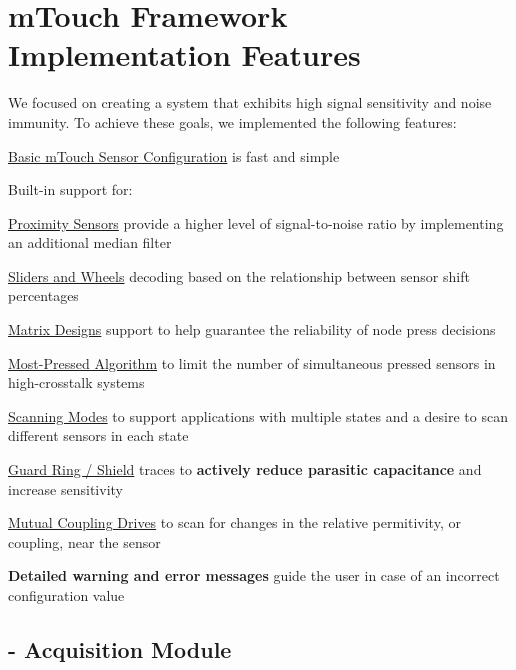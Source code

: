 \hypertarget{_framework_features_Features}{}\section{m\+Touch Framework Implementation Features}\label{_framework_features_Features}
We focused on creating a system that exhibits high signal sensitivity and noise immunity. To achieve these goals, we implemented the following features\+: \begin{DoxyItemize}
\item \hyperlink{featBasic}{Basic m\+Touch Sensor Configuration} is fast and simple \item Built-\/in support for\+: 
\begin{DoxyItemize}
\item \hyperlink{featProximity}{Proximity Sensors} provide a higher level of signal-\/to-\/noise ratio by implementing an additional median filter 
\item \hyperlink{featSliders}{Sliders and Wheels} decoding based on the relationship between sensor shift percentages 
\item \hyperlink{featMatrix}{Matrix Designs} support to help guarantee the reliability of \textquotesingle{}node\textquotesingle{} press decisions 
\item \hyperlink{featMostPressed}{Most-\/\+Pressed Algorithm} to limit the number of simultaneous \textquotesingle{}pressed\textquotesingle{} sensors in high-\/crosstalk systems 
\item \hyperlink{featMode}{Scanning Modes} to support applications with multiple states and a desire to scan different sensors in each state 
\item \hyperlink{featGuard}{Guard Ring / Shield} traces to {\bfseries actively reduce parasitic capacitance} and increase sensitivity 
\item \hyperlink{featMutual}{Mutual Coupling Drives} to scan for changes in the relative permitivity, or coupling, near the sensor 
\end{DoxyItemize}\item {\bfseries Detailed warning and error messages} guide the user in case of an incorrect configuration value \end{DoxyItemize}
\hypertarget{_framework_features_AcquisitionFeatures}{}\subsection{-\/ Acquisition Module}\label{_framework_features_AcquisitionFeatures}
